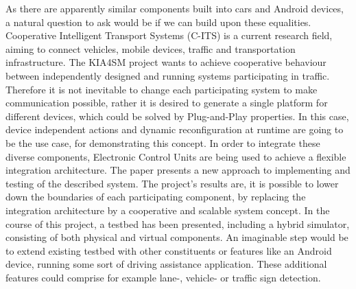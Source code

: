 As there are apparently similar components built into cars and Android devices, a natural question to ask would be if we can build upon these equalities. \newline
Cooperative Intelligent Transport Systems (C-ITS) is a current research field, aiming to connect vehicles, mobile devices, traffic and transportation infrastructure\cite{kia4sm}. The KIA4SM project wants to achieve cooperative behaviour between independently designed and running systems participating in traffic. Therefore it is not inevitable to change each participating system to make communication possible, rather it is desired to generate a single platform for different devices, which could be solved by Plug-and-Play properties. In this case, device independent actions and dynamic reconfiguration at runtime are going to be the use case, for demonstrating this concept. In order to integrate these diverse components, Electronic Control Units are being used to achieve a flexible integration architecture. 
The paper \cite{kia4sm} presents a new approach to implementing and testing of the described system.
The project's results are, it is possible to lower down the boundaries of each participating component, by replacing the integration architecture by a cooperative and scalable system concept. In the course of this project, a testbed has been presented, including a hybrid simulator, consisting of both physical and virtual components. An imaginable step would be to extend existing testbed with other constituents or features like an Android device, running some sort of driving assistance application. These additional features could comprise for example lane-, vehicle- or traffic sign detection. 
